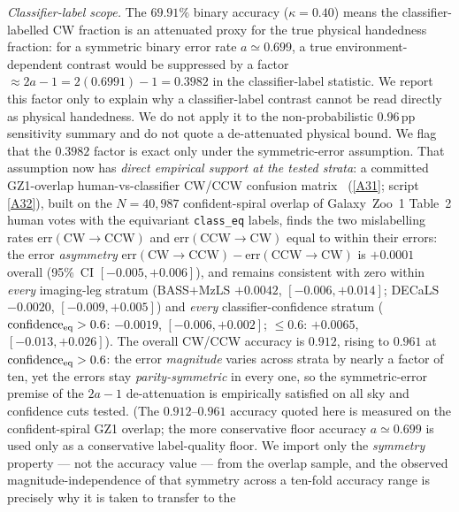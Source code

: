 \documentclass[aps,prd,twocolumn,superscriptaddress,showpacs,preprintnumbers,nofootinbib,longbibliography,floatfix]{revtex4-2}
\newcommand{\repoBase}{https://github.com/Hubify-Projects/bigbounce/blob/main}
\begin{document}
\emph{Classifier-label scope.} The $69.91\%$ binary accuracy
($\kappa=0.40$) means the
classifier-labelled CW fraction is an attenuated proxy for the true
physical handedness fraction: for a symmetric binary error rate
$a\simeq0.699$, a true environment-dependent contrast would be
suppressed by a factor $\approx 2a-1 = 2(0.6991)-1 = 0.3982$ in the
classifier-label statistic. We report this factor only to explain why a
classifier-label contrast cannot be read directly as physical
handedness. We do not apply it to the non-probabilistic $0.96$\,pp
sensitivity summary and do not quote a de-attenuated physical bound.
We flag that the $0.3982$ factor is exact only under the
symmetric-error assumption. That assumption now has \emph{direct empirical
support at the tested strata}: a committed GZ1-overlap human-vs-classifier
CW/CCW confusion matrix~\cite{golden_chirality_2026}
(\href{\repoBase/pipelines/p2\_chirality/outputs/gz1\_stratified\_confusion.json}{[A31]};
script \href{\repoBase/pipelines/p2\_chirality/scripts/gz1\_stratified\_confusion.py}{[A32]}),
built on the
$N=40{,}987$ confident-spiral overlap of Galaxy~Zoo~1 Table~2 human votes with
the equivariant \texttt{class\_eq} labels, finds the two mislabelling rates
$\mathrm{err}(\mathrm{CW}\!\to\!\mathrm{CCW})$ and
$\mathrm{err}(\mathrm{CCW}\!\to\!\mathrm{CW})$ equal to within their errors:
the error \emph{asymmetry}
$\mathrm{err}(\mathrm{CW}\!\to\!\mathrm{CCW})-\mathrm{err}(\mathrm{CCW}\!\to\!\mathrm{CW})$
is $+0.0001$ overall (95\%~CI $[-0.005,+0.006]$), and remains consistent with
zero within \emph{every} imaging-leg stratum (BASS$+$MzLS $+0.0042$,
$[-0.006,+0.014]$; DECaLS $-0.0020$, $[-0.009,+0.005]$) and \emph{every}
classifier-confidence stratum ($\mathrm{confidence}_{\rm eq}>0.6$: $-0.0019$,
$[-0.006,+0.002]$; $\le0.6$: $+0.0065$, $[-0.013,+0.026]$). The overall
CW/CCW accuracy is $0.912$, rising to $0.961$ at
$\mathrm{confidence}_{\rm eq}>0.6$: the error \emph{magnitude} varies across
strata by nearly a factor of ten, yet the errors stay
\emph{parity-symmetric} in every one, so the symmetric-error premise of the
$2a-1$ de-attenuation is empirically satisfied on all sky and confidence cuts
tested. (The $0.912$--$0.961$ accuracy quoted here is measured on the
confident-spiral GZ1 overlap; the more conservative floor accuracy
$a\!\simeq\!0.699$ is used only as a conservative label-quality floor.
We import only the
\emph{symmetry} property --- not the accuracy value --- from the overlap
sample, and the observed magnitude-independence of that symmetry across a
ten-fold accuracy range is precisely why it is taken to transfer to the
\end{document}
